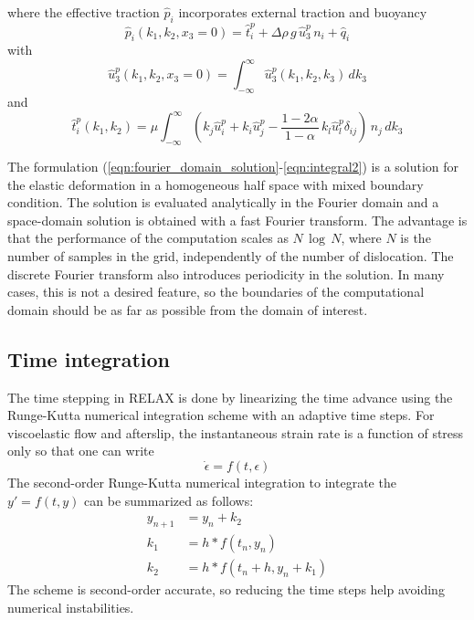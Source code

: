 \documentclass[10pt]{article}
\begin{document}
where the effective traction $\hat{p}_i$ incorporates external traction and buoyancy
\begin{equation}\label{eqn:last_degree_freedom}
\hat{p}_i(k_1,k_2,x_3=0)=\hat{t}^p_i+\Delta\rho\,g\,\hat{u}^p_3\,n_i+\hat{q}_i
\end{equation}
%
with
%
\begin{equation}\label{eqn:integral1}
\hat{u}_3^p(k_1,k_2,x_3=0)=\int_{-\infty}^\infty\hat{u}^p_3(k_1,k_2,k_3)\,dk_3
\end{equation}
and
\begin{equation}\label{eqn:integral2}
\hat{t}^p_i(k_1,k_2)=\mu\int_{-\infty}^\infty\left(k_j\hat{u}^p_i+k_i\hat{u}^p_j-\frac{1-2\alpha}{1-\alpha}\,k_l\hat{u}^p_l\delta_{ij}\right)\,n_j\,dk_3
\end{equation}


The formulation (\ref{eqn:fourier_domain_solution}-\ref{eqn:integral2}) is a solution for the elastic deformation in a homogeneous half space with mixed boundary condition. The solution is evaluated analytically in the Fourier domain and a space-domain solution is obtained with a fast Fourier transform. The advantage is that the performance of the computation scales as $N\,\log\,N$, where $N$ is the number of samples in the grid, independently of the number of dislocation. The discrete Fourier transform also introduces periodicity in the solution. In many cases, this is not a desired feature, so the boundaries of the computational domain should be as far as possible from the domain of interest.

\subsection{Time integration}

The time stepping in RELAX is done by linearizing the time advance using the Runge-Kutta numerical integration scheme with an adaptive time steps.
For viscoelastic flow and afterslip, the instantaneous strain rate is a function of stress only so that one can write
\begin{equation}
\dot{\epsilon} = f(t,\epsilon)
\end{equation}
The second-order Runge-Kutta numerical integration to integrate the $y'=f(t,y)$ can be summarized as follows:
\begin{equation}
\begin{aligned}
y_{n+1} &= y_n + k_2\\
k_1 &= h * f(t_n, y_n)\\
k_2 &= h * f(t_n + h, y_n + k_1)
\end{aligned}
\end{equation}
The scheme is second-order accurate, so reducing the time steps help avoiding numerical instabilities.
\end{document}
